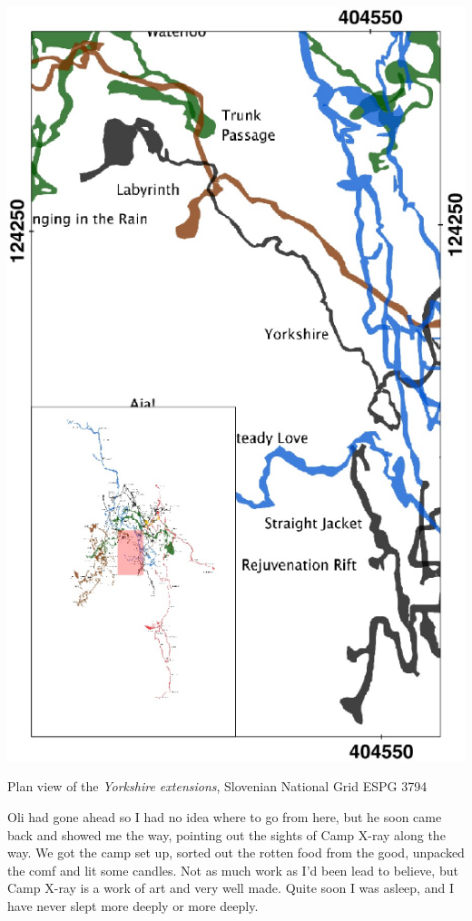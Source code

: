 \begin{marginfigure}
\checkoddpage \ifoddpage \forcerectofloat \else \forceversofloat \fi
\centering
 \includegraphics[width=\linewidth]{images/2015/jack-yorkshire-2015/labyrinth_inset}
 \caption{Plan view of the \emph{Yorkshire extensions}, Slovenian National Grid ESPG 3794}
 \label{Labyrinth inset}
\end{marginfigure}

Oli had gone ahead so I had no idea where to go from here, but he soon came back and showed me the way, pointing out the sights of Camp X-ray along the way. We got the camp set up, sorted out the rotten food from the good, unpacked the comf and lit some candles. Not as much work as I’d been lead to believe, but Camp X-ray is a work of art and very well made. Quite soon I was asleep, and I have never slept more deeply or more deeply.



